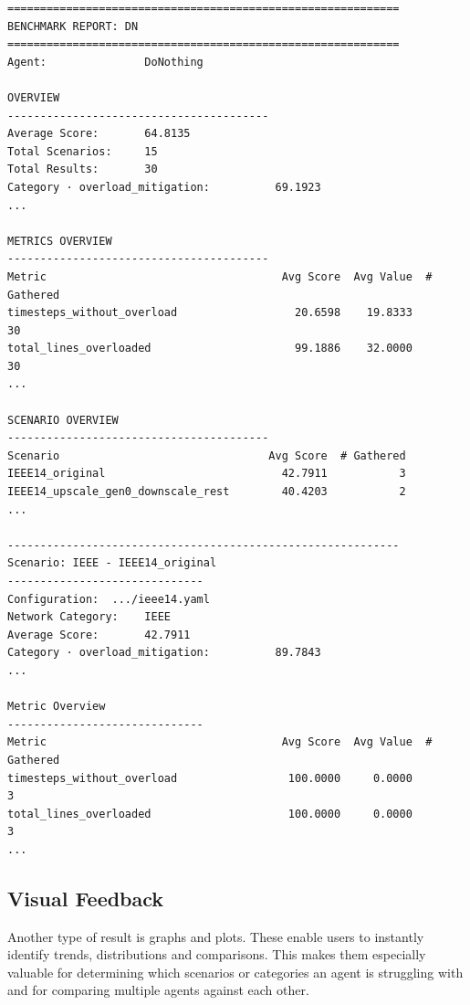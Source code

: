 \begin{listing}[htp]
\begin{verbatim}
============================================================
BENCHMARK REPORT: DN
============================================================
Agent:               DoNothing

OVERVIEW
----------------------------------------
Average Score:       64.8135
Total Scenarios:     15
Total Results:       30
Category · overload_mitigation:          69.1923
...

METRICS OVERVIEW
----------------------------------------
Metric                                    Avg Score  Avg Value  # Gathered
timesteps_without_overload                  20.6598    19.8333          30
total_lines_overloaded                      99.1886    32.0000          30
...

SCENARIO OVERVIEW
----------------------------------------
Scenario                                Avg Score  # Gathered
IEEE14_original                           42.7911           3
IEEE14_upscale_gen0_downscale_rest        40.4203           2
...

------------------------------------------------------------
Scenario: IEEE - IEEE14_original
------------------------------
Configuration:  .../ieee14.yaml
Network Category:    IEEE
Average Score:       42.7911
Category · overload_mitigation:          89.7843
...

Metric Overview
------------------------------
Metric                                    Avg Score  Avg Value  # Gathered
timesteps_without_overload                 100.0000     0.0000           3
total_lines_overloaded                     100.0000     0.0000           3
...
\end{verbatim}
\caption{Exemplary benchmark report for the do-nothing baseline agent.}
\label{lst:textual-report}
\end{listing}

\subsection{Visual Feedback}\label{ssec:visual-feedback}
Another type of result is graphs and plots. These enable users to instantly identify trends, distributions and comparisons. This makes them especially valuable for determining which scenarios or categories an agent is struggling with and for comparing multiple agents against each other.

